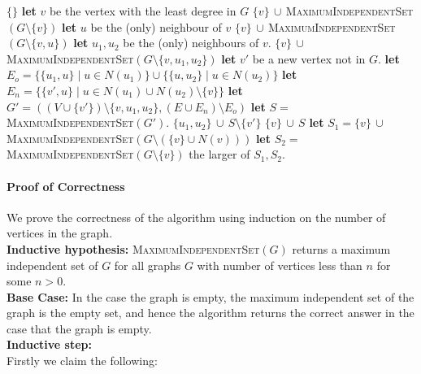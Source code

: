 \documentclass[answers]{exam}
\newcommand{\nl}{\vspace{0.2cm}\\}
\begin{document}
\begin{questions}
\begin{solution}
\begin{algorithmic}[1]
        \State \Return $\{\}$
    \EndIf
    \State \textbf{let} $v$ be the vertex with the least degree in $G$
        \State \Return $\{v\}\, \cup\, $\textsc{MaximumIndependentSet}$(G \setminus \{v\})$
        \State \textbf{let} $u$ be the (only) neighbour of $v$
        \State \Return $\{v\}\, \cup\, $\textsc{MaximumIndependentSet}$(G \setminus \{v, u\})$
        \State \textbf{let} $u_1, u_2$ be the (only) neighbours of $v$.
            \State \Return $\{v\}\, \cup\,$ \textsc{MaximumIndependentSet}$(G \setminus \{v, u_1, u_2\})$
        \Else
            \State \textbf{let} $v'$ be a new vertex not in $G$.
            \State \textbf{let} $E_o = \{\{u_1, u\} \mid u \in N(u_1)\} \cup \{\{u, u_2\} \mid u \in N(u_2)\}$ 
            \State \textbf{let} $E_n = \{\{v', u\} \mid u \in N(u_1) \cup N(u_2) \setminus \{v\}\}$ 
            \State \textbf{let} $G' = ((V \cup \{v'\}) \setminus \{v, u_1, u_2\}, (E \cup E_n) \setminus E_o)$ 
            \State \textbf{let} $S = \,$ \textsc{MaximumIndependentSet}$(G')$.
                \State \Return $\{u_1, u_2\}\, \cup\, S \setminus \{v'\}$ 
            \Else
                \State \Return $\{v\}\, \cup\, S$
            \EndIf
        \EndIf
    \Else {}
        \State \textbf{let} $S_1 = \{v\}\, \cup\,$\textsc{MaximumIndependentSet}$(G \setminus (\{v\} \cup N(v)))$
        \State \textbf{let} $S_2 =\, $\textsc{MaximumIndependentSet}$(G \setminus \{v\})$ 
        \State \Return the larger of $S_1, S_2$.
    \EndIf
\EndFunction
\end{algorithmic}

\paragraph{Proof of Correctness} We prove the correctness of the algorithm using induction on the number of vertices in the graph.\nl
\textbf{Inductive hypothesis:} \textsc{MaximumIndependentSet}$(G)$ returns a maximum independent set of $G$ for all graphs $G$ with number of vertices less than $n$ for some $n > 0$.\nl
\textbf{Base Case:} In the case the graph is empty, the maximum independent set of the graph is the empty set, and hence the algorithm returns the correct answer in the case that the graph is empty.\nl
\textbf{Inductive step:}\nl
Firstly we claim the following:


\end{solution}
\end{questions}
\end{document}
